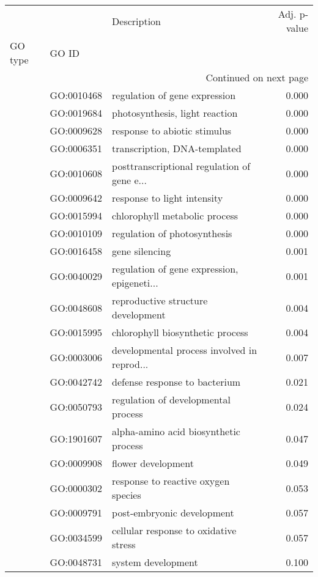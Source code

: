 \begin{longtable}{lllr}
\toprule
   &            &                                  Description &  Adj. p-value \\
GO type & GO ID &                                              &               \\
\midrule
\endhead
\midrule
\multicolumn{4}{r}{{Continued on next page}} \\
\midrule
\endfoot

\bottomrule
\endlastfoot
\multirow{21}{*}{BP} & GO:0010468 &                regulation of gene expression &         0.000 \\
   & GO:0019684 &               photosynthesis, light reaction &         0.000 \\
   & GO:0009628 &                 response to abiotic stimulus &         0.000 \\
   & GO:0006351 &                 transcription, DNA-templated &         0.000 \\
   & GO:0010608 &  posttranscriptional regulation of gene e... &         0.000 \\
   & GO:0009642 &                  response to light intensity &         0.000 \\
   & GO:0015994 &                chlorophyll metabolic process &         0.000 \\
   & GO:0010109 &                 regulation of photosynthesis &         0.000 \\
   & GO:0016458 &                               gene silencing &         0.001 \\
   & GO:0040029 &  regulation of gene expression, epigeneti... &         0.001 \\
   & GO:0048608 &           reproductive structure development &         0.004 \\
   & GO:0015995 &             chlorophyll biosynthetic process &         0.004 \\
   & GO:0003006 &  developmental process involved in reprod... &         0.007 \\
   & GO:0042742 &                defense response to bacterium &         0.021 \\
   & GO:0050793 &          regulation of developmental process &         0.024 \\
   & GO:1901607 &        alpha-amino acid biosynthetic process &         0.047 \\
   & GO:0009908 &                           flower development &         0.049 \\
   & GO:0000302 &          response to reactive oxygen species &         0.053 \\
   & GO:0009791 &                   post-embryonic development &         0.057 \\
   & GO:0034599 &        cellular response to oxidative stress &         0.057 \\
   & GO:0048731 &                           system development &         0.100 \\
\end{longtable}
